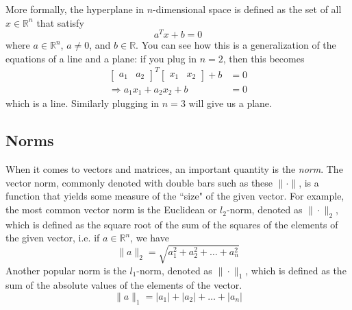 \documentclass[a4paper]{article}
\theoremstyle{definition}
\begin{document}
More formally, the hyperplane in $n$-dimensional space is defined as the set of all $x \in \mathbb{R}^n$ that satisfy
\begin{equation*}
	a^T x + b = 0
\end{equation*}
where $a \in \mathbb{R}^n$, $a \neq 0$, and $b \in \mathbb{R}$.
You can see how this is a generalization of the equations of a line and a plane: if you plug in $n = 2$, then this becomes
\begin{align*}
	\begin{bmatrix}
		a_1 & a_2
	\end{bmatrix}^T
	\begin{bmatrix}
		x_1 & x_2
	\end{bmatrix} + b & = 0 \\
	\Rightarrow a_1 x_1 + a_2 x_2 + b & = 0
\end{align*}
which is a line.
Similarly plugging in $n = 3$ will give us a plane.

\subsection{Norms}
\label{norms}

When it comes to vectors and matrices, an important quantity is the \textit{norm}.
The vector norm, commonly denoted with double bars such as these $\| \cdot \|$, is a function that yields some measure of the ``size" of the given vector.
For example, the most common vector norm is the Euclidean or $l_2$-norm, denoted as $\| \cdot \|_2$, which is defined as the square root of the sum of the squares of the elements of the given vector, i.e. if $a \in \mathbb{R}^n$, we have
\begin{equation*}
	\| a \|_2 = \sqrt{a_1^2 + a_2^2 + \dots + a_n^2}
\end{equation*}
Another popular norm is the $l_1$-norm, denoted as $\| \cdot \|_1$, which is defined as the sum of the absolute values of the elements of the vector.
\begin{equation*}
	\| a \|_1 = | a_1 | + | a_2 | + \dots + | a_n |
\end{equation*}
\end{document}

